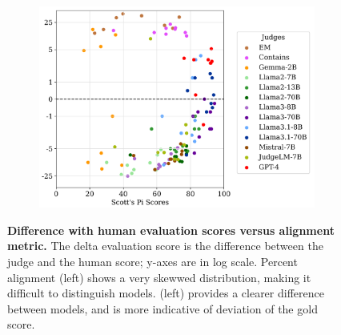 \begin{figure}
\begin{subfigure}[b]{0.565\textwidth}
        \includegraphics[width=0.9\linewidth]{figures/ScottsPiScoreVariation_bV2.pdf}
    \end{subfigure}
    \caption{\textbf{Difference with human evaluation scores versus alignment metric.} 
    The delta evaluation score is the difference between the judge and the human score; y-axes are in log scale. 
    Percent alignment (left) shows a very skewwed distribution, making it difficult to distinguish models.
    \scottspi (left) provides a clearer difference between models, and is more indicative of deviation of the gold score.
    }
    \label{fig:alignment_vs_delta}
\end{figure}

